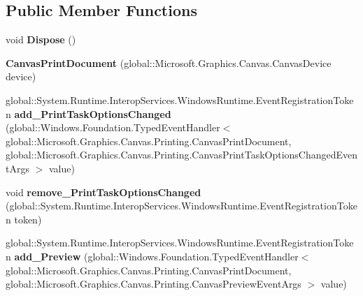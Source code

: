 \subsection*{Public Member Functions}
\begin{DoxyCompactItemize}
\item 
\mbox{\label{class_microsoft_1_1_graphics_1_1_canvas_1_1_printing_1_1_canvas_print_document_af8d1422f1d9da5b6eb9b656d9bb4144a}} 
void {\bfseries Dispose} ()
\item 
\mbox{\label{class_microsoft_1_1_graphics_1_1_canvas_1_1_printing_1_1_canvas_print_document_a4e0992b6bdb01a46f6b04c52e8c394cb}} 
{\bfseries Canvas\+Print\+Document} (global\+::\+Microsoft.\+Graphics.\+Canvas.\+Canvas\+Device device)
\item 
\mbox{\label{class_microsoft_1_1_graphics_1_1_canvas_1_1_printing_1_1_canvas_print_document_a5820ace78b04e0ce349872d83c3d7006}} 
global\+::\+System.\+Runtime.\+Interop\+Services.\+Windows\+Runtime.\+Event\+Registration\+Token {\bfseries add\+\_\+\+Print\+Task\+Options\+Changed} (global\+::\+Windows.\+Foundation.\+Typed\+Event\+Handler$<$ global\+::\+Microsoft.\+Graphics.\+Canvas.\+Printing.\+Canvas\+Print\+Document, global\+::\+Microsoft.\+Graphics.\+Canvas.\+Printing.\+Canvas\+Print\+Task\+Options\+Changed\+Event\+Args $>$ value)
\item 
\mbox{\label{class_microsoft_1_1_graphics_1_1_canvas_1_1_printing_1_1_canvas_print_document_a0de28697a340eecb4f4b11addd897850}} 
void {\bfseries remove\+\_\+\+Print\+Task\+Options\+Changed} (global\+::\+System.\+Runtime.\+Interop\+Services.\+Windows\+Runtime.\+Event\+Registration\+Token token)
\item 
\mbox{\label{class_microsoft_1_1_graphics_1_1_canvas_1_1_printing_1_1_canvas_print_document_a27f47fca50c0e59ac08d765c11296386}} 
global\+::\+System.\+Runtime.\+Interop\+Services.\+Windows\+Runtime.\+Event\+Registration\+Token {\bfseries add\+\_\+\+Preview} (global\+::\+Windows.\+Foundation.\+Typed\+Event\+Handler$<$ global\+::\+Microsoft.\+Graphics.\+Canvas.\+Printing.\+Canvas\+Print\+Document, global\+::\+Microsoft.\+Graphics.\+Canvas.\+Printing.\+Canvas\+Preview\+Event\+Args $>$ value)

\end{DoxyCompactItemize}
